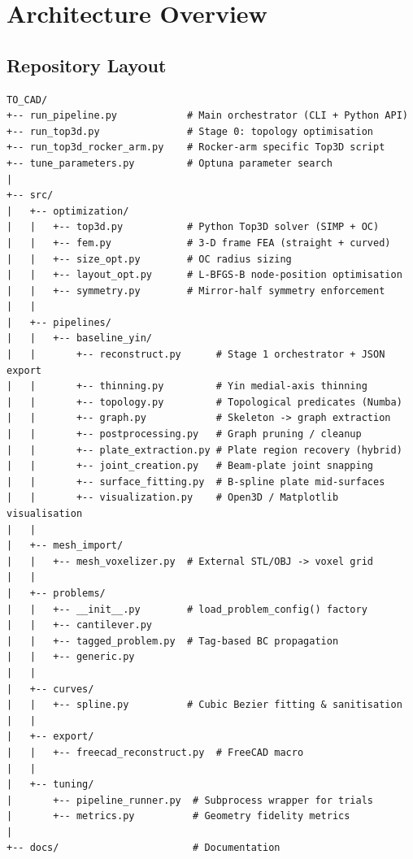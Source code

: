\documentclass[a4paper, 11pt, openany]{report}
\begin{document}
\section{Architecture Overview}
\label{sec:arch-overview}

\subsection{Repository Layout}

\begin{lstlisting}[style=textstyle]
TO_CAD/
+-- run_pipeline.py            # Main orchestrator (CLI + Python API)
+-- run_top3d.py               # Stage 0: topology optimisation
+-- run_top3d_rocker_arm.py    # Rocker-arm specific Top3D script
+-- tune_parameters.py         # Optuna parameter search
|
+-- src/
|   +-- optimization/
|   |   +-- top3d.py           # Python Top3D solver (SIMP + OC)
|   |   +-- fem.py             # 3-D frame FEA (straight + curved)
|   |   +-- size_opt.py        # OC radius sizing
|   |   +-- layout_opt.py      # L-BFGS-B node-position optimisation
|   |   +-- symmetry.py        # Mirror-half symmetry enforcement
|   |
|   +-- pipelines/
|   |   +-- baseline_yin/
|   |       +-- reconstruct.py      # Stage 1 orchestrator + JSON export
|   |       +-- thinning.py         # Yin medial-axis thinning
|   |       +-- topology.py         # Topological predicates (Numba)
|   |       +-- graph.py            # Skeleton -> graph extraction
|   |       +-- postprocessing.py   # Graph pruning / cleanup
|   |       +-- plate_extraction.py # Plate region recovery (hybrid)
|   |       +-- joint_creation.py   # Beam-plate joint snapping
|   |       +-- surface_fitting.py  # B-spline plate mid-surfaces
|   |       +-- visualization.py    # Open3D / Matplotlib visualisation
|   |
|   +-- mesh_import/
|   |   +-- mesh_voxelizer.py  # External STL/OBJ -> voxel grid
|   |
|   +-- problems/
|   |   +-- __init__.py        # load_problem_config() factory
|   |   +-- cantilever.py
|   |   +-- tagged_problem.py  # Tag-based BC propagation
|   |   +-- generic.py
|   |
|   +-- curves/
|   |   +-- spline.py          # Cubic Bezier fitting & sanitisation
|   |
|   +-- export/
|   |   +-- freecad_reconstruct.py  # FreeCAD macro
|   |
|   +-- tuning/
|       +-- pipeline_runner.py  # Subprocess wrapper for trials
|       +-- metrics.py          # Geometry fidelity metrics
|
+-- docs/                       # Documentation
\end{lstlisting}
\end{document}
